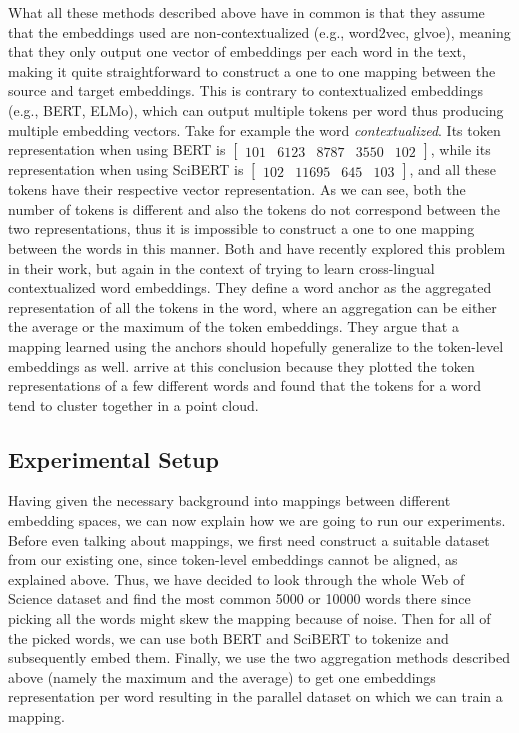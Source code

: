 \documentclass[12pt]{extreport}
\begin{document}
What all these methods described above have in common is that they assume that the embeddings used are non-contextualized (e.g., word2vec, glvoe), meaning that they only output one vector of embeddings per each word in the text, making it quite straightforward to construct a one to one mapping between the source and target embeddings. This is contrary to contextualized embeddings (e.g., BERT, ELMo), which can output multiple tokens per word thus producing multiple embedding vectors. Take for example the word \emph{contextualized}. Its token representation when using BERT is $\begin{bmatrix} 101 & 6123 & 8787 & 3550 & 102 \end{bmatrix}$, while its representation when using SciBERT is $\begin{bmatrix} 102 & 11695 & 645 & 103 \end{bmatrix}$, and all these tokens have their respective vector representation. As we can see, both the number of tokens is different and also the tokens do not correspond between the two representations, thus it is impossible to construct a one to one mapping between the words in this manner. Both \cite{crosslingual} and \cite{investigating-cross-lingual} have recently explored this problem in their work, but again in the context of trying to learn cross-lingual contextualized word embeddings. They define a word anchor as the aggregated representation of all the tokens in the word, where an aggregation can be either the average or the maximum of the token embeddings. They argue that a mapping learned using the anchors should hopefully generalize to the token-level embeddings as well. \cite{crosslingual} arrive at this conclusion because they plotted the token representations of a few different words and found that the tokens for a word tend to cluster together in a point cloud.

\subsection{Experimental Setup}

Having given the necessary background into mappings between different embedding spaces, we can now explain how we are going to run our experiments. Before even talking about mappings, we first need construct a suitable dataset from our existing one, since token-level embeddings cannot be aligned, as explained above. Thus, we have decided to look through the whole Web of Science dataset and find the most common 5000 or 10000 words there since picking all the words might skew the mapping because of noise. Then for all of the picked words, we can use both BERT and SciBERT to tokenize and subsequently embed them. Finally, we use the two aggregation methods described above (namely the maximum and the average) to get one embeddings representation per word resulting in the parallel dataset on which we can train a mapping.
\end{document}
